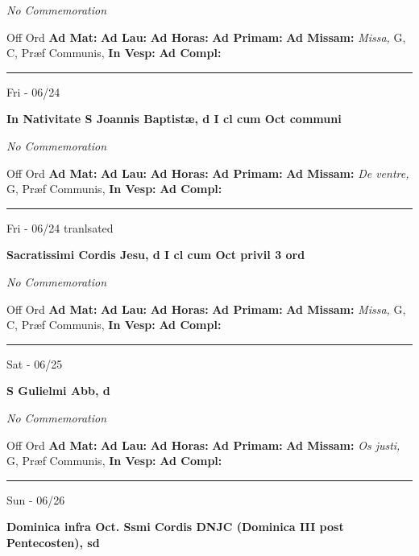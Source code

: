 \documentclass[letterpaper, 10pt]{article}
\begin{document}
\textit{No Commemoration}\begin{justify}
Off Ord
\textbf{Ad Mat: }
\textbf{Ad Lau: }
\textbf{Ad Horas: }
\textbf{Ad Primam: }
\textbf{Ad Missam:} \textit{Missa, } G, C, Præf Communis, 
\textbf{In Vesp: }
\textbf{Ad Compl: }\end{justify}



\hrule
\begin{center}
Fri - 06/24
\end{center}\textbf{ \large In Nativitate S Joannis Baptistæ, \textnormal{\normalsize d I cl cum Oct communi}}

\textit{No Commemoration}\begin{justify}
Off Ord
\textbf{Ad Mat: }
\textbf{Ad Lau: }
\textbf{Ad Horas: }
\textbf{Ad Primam: }
\textbf{Ad Missam:} \textit{De ventre, } G, Præf Communis, 
\textbf{In Vesp: }
\textbf{Ad Compl: }\end{justify}



\hrule
\begin{center}
Fri - 06/24 tranlsated
\end{center}\textbf{ \large Sacratissimi Cordis Jesu, \textnormal{\normalsize d I cl cum Oct privil 3 ord}}

\textit{No Commemoration}\begin{justify}
Off Ord
\textbf{Ad Mat: }
\textbf{Ad Lau: }
\textbf{Ad Horas: }
\textbf{Ad Primam: }
\textbf{Ad Missam:} \textit{Missa, } G, C, Præf Communis, 
\textbf{In Vesp: }
\textbf{Ad Compl: }\end{justify}



\hrule
\begin{center}
Sat - 06/25
\end{center}\textbf{ \large S Gulielmi Abb, \textnormal{\normalsize d}}

\textit{No Commemoration}\begin{justify}
Off Ord
\textbf{Ad Mat: }
\textbf{Ad Lau: }
\textbf{Ad Horas: }
\textbf{Ad Primam: }
\textbf{Ad Missam:} \textit{Os justi, } G, Præf Communis, 
\textbf{In Vesp: }
\textbf{Ad Compl: }\end{justify}



\hrule
\begin{center}
Sun - 06/26
\end{center}\textbf{ \large Dominica infra Oct. Ssmi Cordis DNJC (Dominica III post Pentecosten), \textnormal{\normalsize sd}}
\end{document}

